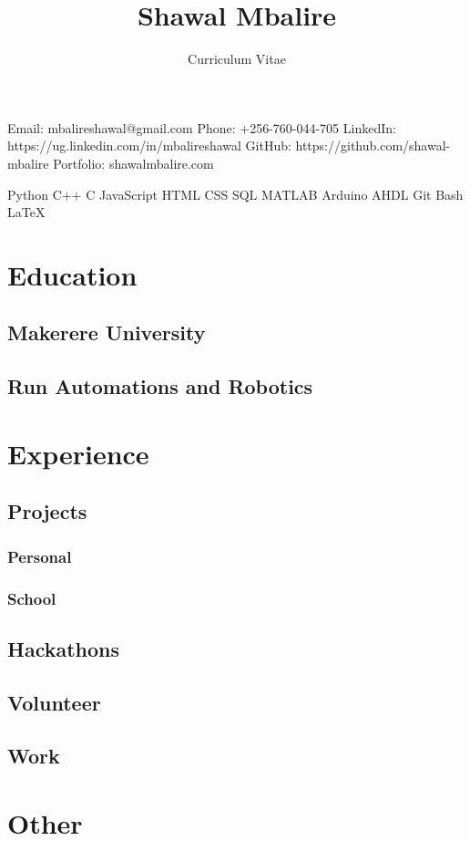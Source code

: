 \documentclass[10pt,a4paper]{article}
\title{Shawal Mbalire}
\author{Curriculum Vitae}
\begin{document}
\maketitle

{Email: mbalireshawal@gmail.com}
{Phone: +256-760-044-705}
{LinkedIn: https://ug.linkedin.com/in/mbalireshawal}
{GitHub: https://github.com/shawal-mbalire}
{Portfolio: shawalmbalire.com} \cr

{Python} {C++} {C} {JavaScript} {HTML} {CSS} {SQL} {MATLAB}
{Arduino} {AHDL} {Git} {Bash} {LaTeX} \cr

\section*{Education}%
\subsection*{Makerere University}
\subsection*{Run Automations and Robotics}

\section*{Experience}
\subsection*{Projects}
\subsubsection*{Personal}
\subsubsection*{School}
\subsection*{Hackathons}
\subsection*{Volunteer}
\subsection*{Work}

\section*{Other}
\end{document}
